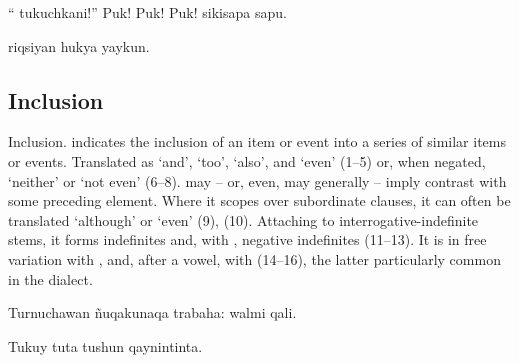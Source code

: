 %
{``\textexclamdown{} tukuchkani!'' Puk! Puk! Puk! sikisapa sapu.}%
{}%
{}{}%

%
{ riqsiyan hukya yaykun.}%
{}%
{}{}%

\subsection{Inclusion }
Inclusion.  indicates the inclusion of an item or event into a series of similar items or events. Translated as `and', `too', `also', and `even' (1--5) or, when negated, `neither' or `not even' (6--8).  may -- or, even, may generally -- imply contrast with some preceding element. Where it scopes over subordinate clauses, it can often be translated `although' or `even' (9), (10). Attaching to interrogative-indefinite stems, it forms indefinites and, with , negative indefinites (11--13). It is in free variation with , and, after a vowel, with  (14--16), the latter particularly common in the \ACH{} dialect.

%
{Turnuchawan \~nuqakunaqa trabaha: walmi qali.}%
{}%
{}{}%

%
{Tukuy tuta tushun qaynintinta.}%
{}%
{}{}%

